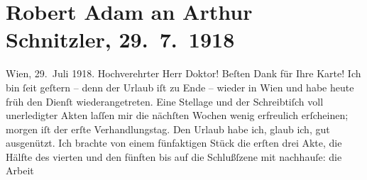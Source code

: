 

         
         \renewcommand{\erwaehntePersonen}{Personen: Robert Adam,  Molière}
         \renewcommand{\erwaehnteOrte}{Orte: Andorf, Wien}
         \renewcommand{\erwaehnteWerke}{Werke: Robert, Yppl. Idylle in fünf Akten}
               \section[Robert Adam an Arthur Schnitzler, 29. 7. 1918]{ Robert Adam an Arthur Schnitzler, 29. 7. 1918}\nopagebreak{}\rehead{ }\begin{ledgroupsized}[t]{13cm}\normalsize\beginnumbering{} \toendnotes[C]{\smallbreak\pagebreak[2]} 
\toendnotes[C]{\smallbreak}\pstart
           \raggedleft{}{\pb}Wien, 29. Juli 1918.\pend
           \pstart\center{}Hochverehrter Herr Doktor!\pend\pstart
           Beſten Dank für Ihre Karte!\pend
           \pstart
           Ich bin ſeit geſtern – denn der Urlaub iſt zu Ende – wieder in Wien und habe heute früh den Dienſt wiederangetreten. Eine
               Stellage und der Schreibtiſch voll unerledigter Akten laſſen mir die nächſten Wochen
               wenig erfreulich erſcheinen; morgen iſt der erſte Verhandlungstag.\pend
           \pstart
           Den Urlaub habe ich, glaub ich, gut ausgenützt. Ich brachte von einem fünfaktigen Stück die erſten drei Akte, die
               Hälfte des vierten und den fünften bis auf die Schlußſzene mit nachhauſe: die Arbeit

\end{ledgroupsized}
